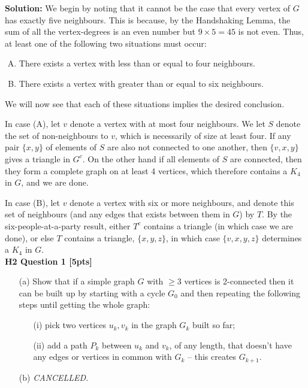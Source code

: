 \documentclass[10pt,landscape]{article}
\renewcommand{\geq}{\geqslant}
\begin{document}
\begin{multicols}{2}
\textbf{Solution:}
We begin by noting that it cannot be the case that every vertex of $G$ has exactly five neighbours. This is because, by the Handshaking Lemma, the sum of all the vertex-degrees is an even number but $9\times 5=45$ is not even.
Thus, at least one of the following two situations must occur:
\begin{enumerate}[(A)]
    \item There exists a vertex with less than or equal to four neighbours.
    \item There exists a vertex with greater than or equal to six neighbours.
\end{enumerate}
We will now see that each of these situations implies the desired conclusion.

In case (A), let $v$ denote a vertex with at most four neighbours.  We let $S$ denote the set of non-neighbours to $v$, which is necessarily of size at least four.  If any pair $\{x,y\}$ of elements of $S$ are also not connected to one another, then $\{v,x,y\}$ gives a triangle in $G^c$.  On the other hand if all elements of $S$ are connected, then they form a complete graph on at least 4 vertices, which therefore contains a $K_4$ in $G$, and we are done.

In case (B), let $v$ denote a vertex with six or more neighbours, and denote this set of neighbours (and any edges that exists between them in $G$) by $T$.  By the six-people-at-a-party result, either $T^c$ contains a triangle (in which case we are done), or else $T$ contains a triangle, $\{x,y,z\}$, in which case $\{v,x,y,z\}$ determines a $K_4$ in $G$.\\


\bigskip
\textbf{H2 Question 1 [5pts]}


\begin{enumerate}
\item[(a)] Show that if a simple graph $G$ with $\geq 3$ vertices is 2-connected then it can be built up by starting with a cycle $G_0$ and then repeating the following steps until getting the whole graph:
\begin{enumerate}
\item[(i)] pick two vertices $u_k,v_k$ in the graph $G_k$ built so far;
\item[(ii)] add a path $P_k$ between $u_k$ and $v_k$, of any length, that doesn't have any edges or vertices in common with $G_k$ -- this creates $G_{k+1}$.
\end{enumerate}

\item[(b)] \emph{CANCELLED.}
\end{enumerate}


\end{multicols}
\end{document}
